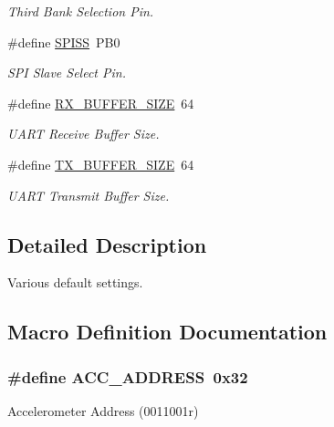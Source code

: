 \begin{DoxyCompactItemize}
\begin{DoxyCompactList}\small\item\em Third Bank Selection Pin. \end{DoxyCompactList}\item 
\#define \hyperlink{group__config_gab652052c0495e4b720b52cdcf83f535d}{S\-P\-I\-S\-S}~P\-B0
\begin{DoxyCompactList}\small\item\em S\-P\-I Slave Select Pin. \end{DoxyCompactList}\item 
\#define \hyperlink{group__config_ga739a2a1a0047c98ac1b18ecd25dac092}{R\-X\-\_\-\-B\-U\-F\-F\-E\-R\-\_\-\-S\-I\-Z\-E}~64
\begin{DoxyCompactList}\small\item\em U\-A\-R\-T Receive Buffer Size. \end{DoxyCompactList}\item 
\#define \hyperlink{group__config_ga9ab33647617098646990fe263600b650}{T\-X\-\_\-\-B\-U\-F\-F\-E\-R\-\_\-\-S\-I\-Z\-E}~64
\begin{DoxyCompactList}\small\item\em U\-A\-R\-T Transmit Buffer Size. \end{DoxyCompactList}\end{DoxyCompactItemize}


\subsection{Detailed Description}
Various default settings. 

\subsection{Macro Definition Documentation}
\hypertarget{group__config_ga27341a8e1cb1a6ace5a5cf3caea1c99f}{
\subsubsection[{A\-C\-C\-\_\-\-A\-D\-D\-R\-E\-S\-S}]{\setlength{\rightskip}{0pt plus 5cm}\#define A\-C\-C\-\_\-\-A\-D\-D\-R\-E\-S\-S~0x32}}\label{group__config_ga27341a8e1cb1a6ace5a5cf3caea1c99f}


Accelerometer Address (0011001r) 



